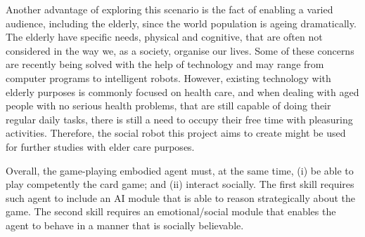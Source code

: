 Another advantage of exploring this scenario is the fact of enabling a varied audience, including the elderly, since the world population is ageing dramatically.
The elderly have specific needs, physical and cognitive, that are often not considered in the way we, as a society, organise our lives.
Some of these concerns are recently being solved with the help of technology and may range from computer programs to intelligent robots.
However, existing technology with elderly purposes is commonly focused on health care, and when dealing with aged people with no serious health problems, that are still capable of doing their regular daily tasks, there is still a need to occupy their free time with pleasuring activities.
Therefore, the social robot this project aims to create might be used for further studies with elder care purposes.

Overall, the game-playing embodied agent must, at the same time, (i) be able to play competently the card game; and (ii) interact socially. The first skill requires such agent to include an AI module that is able to reason strategically about the game. The second skill requires an emotional/social module that enables the agent to behave in a manner that is socially believable.





